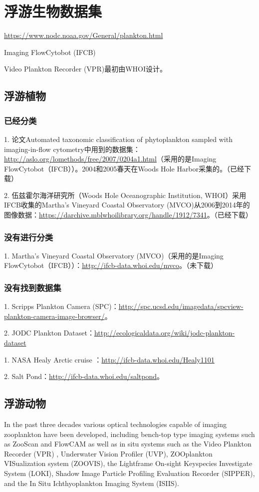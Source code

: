 \section{浮游生物数据集}
\url{https://www.nodc.noaa.gov/General/plankton.html}

Imaging FlowCytobot (IFCB)

Video Plankton Recorder (VPR)最初由WHOI设计。


\subsection{浮游植物}

\subsubsection{已经分类}
1. 论文Automated taxonomic classification of phytoplankton sampled with imaging-in-flow cytometry中用到的数据集：\url{http://aslo.org/lomethods/free/2007/0204a1.html}（采用的是Imaging FlowCytobot（IFCB））。2004和2005春天在Woods Hole Harbor采集的。（已经下载）

2. 伍兹霍尔海洋研究所（Woods Hole Oceanographic Institution, WHOI）采用IFCB收集的Martha's Vineyard Coastal Observatory (MVCO)从2006到2014年的图像数据：\url{https://darchive.mblwhoilibrary.org/handle/1912/7341}。（已经下载）

\subsubsection{没有进行分类}
1. Martha’s Vineyard Coastal Observatory (MVCO)（采用的是Imaging FlowCytobot（IFCB））：\url{http://ifcb-data.whoi.edu/mvco}。（未下载）



\subsubsection{没有找到数据集}
1. Scripps Plankton Camera (SPC)：\url{http://spc.ucsd.edu/imagedata/spcview-plankton-camera-image-browser/}。

2. JODC Plankton Dataset：\url{http://ecologicaldata.org/wiki/jodc-plankton-dataset}



1. NASA Healy Arctic cruise ：\url{http://ifcb-data.whoi.edu/Healy1101}

2. Salt Pond：\url{http://ifcb-data.whoi.edu/saltpond}。




\subsection{浮游动物}
In the past three decades various optical technologies capable of imaging zooplankton have been developed, including bench-top type imaging systems such as ZooScan and FlowCAM as well as in situ systems such as the Video Plankton Recorder (VPR) , Underwater Vision Profiler (UVP), ZOOplankton VISualization system (ZOOVIS), the Lightframe On-sight Keyspecies Investigate System (LOKI), Shadow Image Particle Profiling Evaluation Recorder (SIPPER), and the In Situ Ichthyoplankton Imaging System (ISIIS).

